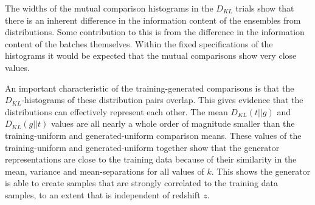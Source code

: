 \documentclass[twocolumn]{article}
\numberwithin{equation}{section}
\begin{document}
The widths of the mutual comparison histograms in the $D_{KL}$ trials show that there is an inherent difference in the 
information content of the ensembles from distributions. Some contribution to this is from the difference in the information
content of the batches themselves. Within the fixed specifications of the histograms it would be expected that the mutual 
comparisons show very close values. 

An important characteristic of the training-generated comparisons is that the $D_{KL}$-histograms of these distribution 
pairs overlap. This gives evidence that the distributions can effectively represent each other. The mean $D_{KL}(t||g)$ and 
$D_{KL}(g||t)$ values are all nearly a whole order of magnitude smaller than the training-uniform and generated-uniform 
comparison means. These values of the training-uniform and generated-uniform together show that the generator 
representations are close to the training data because of their similarity in the mean, variance and mean-separations 
for all values of $k$. This shows the generator is able to create samples that are strongly correlated to the training 
data samples, to an extent that is independent of redshift $z$. %

\end{document}
